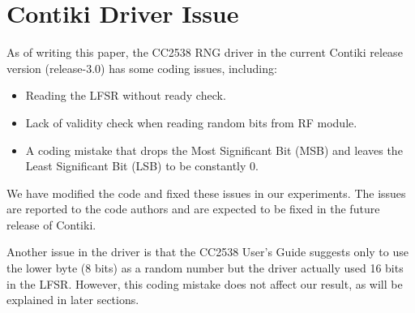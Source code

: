 \section{Contiki Driver Issue}
As of writing this paper,  the CC2538 RNG driver in the current Contiki release version (release-3.0) has some coding issues, including:
\begin{itemize}
	\item Reading the LFSR without ready check.
	\item Lack of validity check when reading random bits from RF module.
	\item A coding mistake that drops the Most Significant Bit (MSB) and leaves the Least Significant Bit (LSB) to be constantly $0$.
\end{itemize}

We have modified the code and fixed these issues in our experiments. The issues are reported to the code authors and are expected to be fixed in the future release of Contiki.

Another issue in the driver is that the CC2538 User's Guide\cite{CC2538Manual} suggests only to use the lower byte (8 bits) as a random number but the driver actually used 16 bits in the LFSR. However, this coding mistake does not affect our result, as will be explained in  later sections.